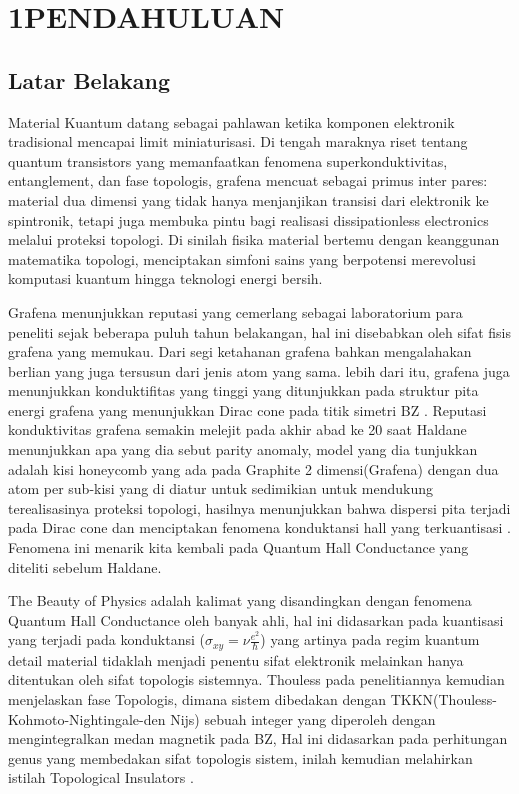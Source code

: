 \chapter{1PENDAHULUAN}

\RaggedRight\section{Latar Belakang}
\justifying

Material Kuantum datang sebagai pahlawan ketika komponen elektronik tradisional mencapai limit miniaturisasi. Di tengah maraknya riset tentang quantum transistors yang memanfaatkan fenomena superkonduktivitas, entanglement, dan fase topologis\parencite{Chang2015}, grafena mencuat sebagai primus inter pares: material dua dimensi yang tidak hanya menjanjikan transisi dari elektronik ke spintronik, tetapi juga membuka pintu bagi realisasi dissipationless electronics melalui proteksi topologi. Di sinilah fisika material bertemu dengan keanggunan matematika topologi, menciptakan simfoni sains yang berpotensi merevolusi komputasi kuantum hingga teknologi energi bersih\parencite{Nadeem2021}.
\par
Grafena menunjukkan reputasi yang cemerlang sebagai laboratorium para peneliti sejak beberapa puluh tahun belakangan, hal ini disebabkan oleh sifat fisis grafena yang memukau. Dari segi ketahanan grafena bahkan mengalahakan berlian yang juga tersusun dari jenis atom yang sama. lebih dari itu, grafena juga menunjukkan konduktifitas yang tinggi yang ditunjukkan pada struktur pita energi grafena yang menunjukkan Dirac cone pada titik simetri BZ \parencite{PhysRev.71.622}\parencite{PhysRevB.1.4747}. Reputasi konduktivitas grafena semakin melejit pada akhir abad ke 20 saat Haldane menunjukkan apa yang dia sebut parity anomaly, model yang dia tunjukkan adalah kisi honeycomb yang ada pada Graphite 2 dimensi(Grafena) dengan dua atom per sub-kisi yang di diatur untuk sedimikian untuk mendukung terealisasinya proteksi topologi, hasilnya menunjukkan bahwa dispersi pita terjadi pada Dirac cone dan menciptakan fenomena konduktansi hall yang terkuantisasi \parencite{PhysRevLett.61.2015}. Fenomena ini menarik kita kembali pada Quantum Hall Conductance yang diteliti sebelum Haldane.
\par
    The Beauty of Physics adalah kalimat yang disandingkan dengan fenomena Quantum Hall Conductance oleh banyak ahli, hal ini didasarkan pada kuantisasi yang terjadi pada konduktansi ($\sigma_{xy}=\nu \frac{e^2}{\hbar}$) yang artinya pada regim kuantum detail material tidaklah menjadi penentu sifat elektronik melainkan hanya ditentukan oleh sifat topologis sistemnya\parencite{PhysRevLett.45.494}. Thouless pada penelitiannya kemudian menjelaskan fase Topologis, dimana sistem dibedakan dengan TKKN(Thouless-Kohmoto-Nightingale-den Nijs) sebuah integer yang diperoleh dengan mengintegralkan medan magnetik pada BZ, Hal ini didasarkan pada perhitungan genus yang membedakan sifat topologis sistem, inilah kemudian melahirkan istilah Topological Insulators \parencite{PhysRevLett.49.405}. 
